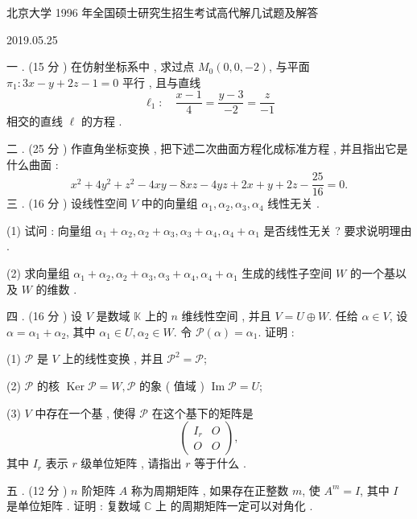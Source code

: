 \documentclass[10pt]{article}
\begin{document}
 北京大学  1996  年全国硕士研究生招生考试高代解几试题及解答 

   

2019.05.25

 一 . (15  分 )  在仿射坐标系中 ,  求过点  $M_{0}(0,0,-2)$,  与平面  $\pi_{1}: 3 x-y+2 z-1=0$  平行 ,  且与直线 
$$
\ell_{1}: \quad \frac{x-1}{4}=\frac{y-3}{-2}=\frac{z}{-1}
$$
 相交的直线  $\ell$  的方程 .

 二 . (25  分 )  作直角坐标变换 ,  把下述二次曲面方程化成标准方程 ,  并且指出它是什么曲面 :
$$
x^{2}+4 y^{2}+z^{2}-4 x y-8 x z-4 y z+2 x+y+2 z-\frac{25}{16}=0 .
$$
 三 . (16  分 )  设线性空间  $V$  中的向量组  $\alpha_{1}, \alpha_{2}, \alpha_{3}, \alpha_{4}$  线性无关 .

(1)  试问 :  向量组  $\alpha_{1}+\alpha_{2}, \alpha_{2}+\alpha_{3}, \alpha_{3}+\alpha_{4}, \alpha_{4}+\alpha_{1}$  是否线性无关 ?  要求说明理由 .

(2)  求向量组  $\alpha_{1}+\alpha_{2}, \alpha_{2}+\alpha_{3}, \alpha_{3}+\alpha_{4}, \alpha_{4}+\alpha_{1}$  生成的线性子空间  $W$  的一个基以及  $W$  的维数 .

 四 . (16  分 )  设  $V$  是数域  $\mathbb{K}$  上的  $n$  维线性空间 ,  并且  $V=U \oplus W$.  任给  $\alpha \in V$,  设  $\alpha=\alpha_{1}+\alpha_{2}$,  其中  $\alpha_{1} \in U, \alpha_{2} \in W$.  令  $\mathscr{P}(\alpha)=\alpha_{1}$.  证明 :

(1) $\mathscr{P}$  是  $V$  上的线性变换 ,  并且  $\mathscr{P}^{2}=\mathscr{P}$;

(2) $\mathscr{P}$  的核  $\operatorname{Ker} \mathscr{P}=W, \mathscr{P}$  的象  ( 值域 ) $\operatorname{Im} \mathscr{P}=U$;

(3) $V$  中存在一个基 ,  使得  $\mathscr{P}$  在这个基下的矩阵是 
$$
\left(\begin{array}{ll}
I_{r} & O \\
O & O
\end{array}\right),
$$
 其中  $I_{r}$  表示  $r$  级单位矩阵 ,  请指出  $r$  等于什么 .

 五 . (12  分 ) $n$  阶矩阵  $A$  称为周期矩阵 ,  如果存在正整数  $m$,  使  $A^{m}=I$,  其中  $I$  是单位矩阵 .  证明 :  复数域  $\mathbb{C}$  上   的周期矩阵一定可以对角化 .
\end{document}
